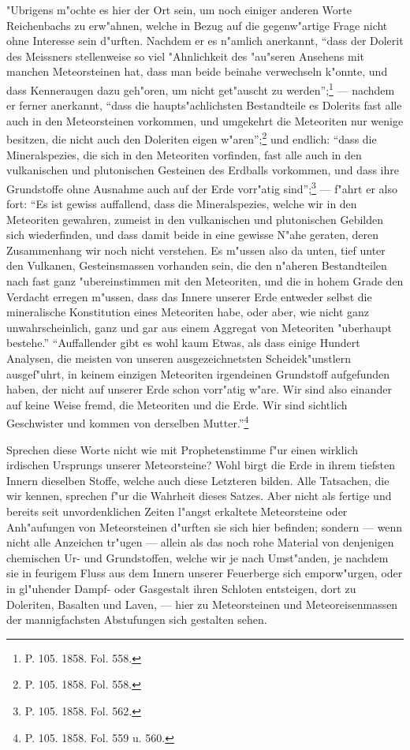 \documentclass[a4paper, 8pt, oneside, polutonikogreek, german]{article}
\begin{document}
"Ubrigens m"ochte es hier der Ort sein, um noch einiger anderen Worte Reichenbachs zu erw"ahnen, welche in Bezug auf die gegenw"artige Frage nicht ohne Interesse sein d"urften. Nachdem er es n"amlich anerkannt, "`dass der Dolerit des Meissners stellenweise so viel "Ahnlichkeit des "au"seren Ansehens mit manchen Meteorsteinen hat, dass man beide beinahe verwechseln k"onnte, und dass Kenneraugen dazu geh"oren, um nicht get"auscht zu werden"';\footnote{P. 105. 1858. Fol. 558.} --- nachdem er ferner anerkannt, "`dass die haupts"achlichsten Bestandteile es Dolerits fast alle auch in den Meteorsteinen vorkommen, und umgekehrt die Meteoriten nur wenige besitzen, die nicht auch den Doleriten eigen w"aren"';\footnote{P. 105. 1858. Fol. 558.} und endlich: "`dass die Mineralspezies, die sich in den Meteoriten vorfinden, fast alle auch in den vulkanischen und plutonischen Gesteinen des Erdballs vorkommen, und dass ihre Grundstoffe ohne Ausnahme auch auf der Erde vorr"atig sind"';\footnote{P. 105. 1858. Fol. 562.} --- f"ahrt er also fort: "`Es ist gewiss auffallend, dass die Mineralspezies, welche wir in den Meteoriten gewahren, zumeist in den vulkanischen und plutonischen Gebilden sich wiederfinden, und dass damit beide in eine gewisse N"ahe geraten, deren Zusammenhang wir noch nicht verstehen. Es m"ussen also da unten, tief unter den Vulkanen, Gesteinsmassen vorhanden sein, die den n"aheren Bestandteilen nach fast ganz "ubereinstimmen mit den Meteoriten, und die in hohem Grade den Verdacht erregen m"ussen, dass das Innere unserer Erde entweder selbst die mineralische Konstitution eines Meteoriten habe, oder aber, wie nicht ganz unwahrscheinlich, ganz und gar aus einem Aggregat von Meteoriten "uberhaupt bestehe."' "`Auffallender gibt es wohl kaum Etwas, als dass einige Hundert Analysen, die meisten von unseren ausgezeichnetsten Scheidek"unstlern ausgef"uhrt, in keinem einzigen Meteoriten irgendeinen Grundstoff aufgefunden haben, der nicht auf unserer Erde schon vorr"atig w"are. Wir sind also einander auf keine Weise fremd, die Meteoriten und die Erde. Wir sind sichtlich Geschwister und kommen von derselben Mutter."'\footnote{P. 105. 1858. Fol. 559 u. 560.}

Sprechen diese Worte nicht wie mit Prophetenstimme f"ur einen wirklich irdischen Ursprungs unserer Meteorsteine? Wohl birgt die Erde in ihrem tiefsten Innern dieselben Stoffe, welche auch diese Letzteren bilden. Alle Tatsachen, die wir kennen, sprechen f"ur die Wahrheit dieses Satzes. Aber nicht als fertige und bereits seit unvordenklichen Zeiten l"angst erkaltete Meteorsteine oder Anh"aufungen von Meteorsteinen d"urften sie sich hier befinden; sondern --- wenn nicht alle Anzeichen tr"ugen --- allein als das noch rohe Material von denjenigen chemischen Ur- und Grundstoffen, welche wir je nach Umst"anden, je nachdem sie in feurigem Fluss aus dem Innern unserer Feuerberge sich emporw"urgen, oder in gl"uhender Dampf- oder Gasgestalt ihren Schloten entsteigen, dort zu Doleriten, Basalten und Laven, --- hier zu Meteorsteinen und Meteoreisenmassen der mannigfachsten Abstufungen sich gestalten sehen.
\end{document}
